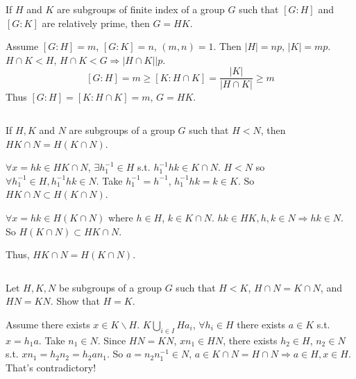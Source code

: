 $$ $$

\begin{ex}
    If $H$ and $K$ are subgroups of finite index of a group $G$ such that $\left[G:H\right]$ and $\left[G:K\right]$ are relatively prime, then $G=HK$.
\end{ex}

\begin{answer}
    Assume $\left[G:H\right]=m$, $\left[G:K\right]=n$, $(m,n)=1$. Then $\left| H \right| =np$, $\left| K \right|=mp$. $H\cap K<H$, $H\cap K<G\Rightarrow\left| H\cap K \right| |p$. \[\left[G:H\right]=m\geq \left[K:H\cap K\right]=\frac{\left| K \right| }{\left| H\cap K \right| }\geq m\] Thus $\left[G:H\right]=\left[K:H\cap K\right]=m$, $G=HK$.
\end{answer}

$$ $$

\begin{ex}
    If $H,K$ and $N$ are subgroups of a group $G$ such that $H<N$, then $HK\cap N=H(K\cap N)$. 
\end{ex}

\begin{answer}
    $\forall x=hk\in HK\cap N$, $\exists h_{1}^{-1}\in H$ s.t. $h_{1}^{-1}hk\in K\cap N$. $H<N$ so $\forall h_{1}^{-1}\in H, h_{1}^{-1}hk\in N$. Take $h_{1}^{-1}=h^{-1}$, $h_{1}^{-1}hk=k\in K$. So $HK\cap N\subset H(K\cap N)$.

    $\forall x= hk\in H(K\cap N)$ where $h\in H$, $k\in K\cap N$. $hk\in HK, h,k\in N\Rightarrow hk\in N$. So $H(K\cap N)\subset HK\cap N$. 

    Thus, $HK\cap N=H(K\cap N)$.
\end{answer}

$$ $$

\begin{ex}
    Let $H,K,N$ be subgroups of a group $G$ such that $H<K$, $H\cap N=K\cap N$, and $HN=KN$. Show that $H=K$.
\end{ex}

\begin{answer}
    Assume there exists $x\in K\backslash H$. $K\bigcup\limits_{i\in I}Ha_{i}$, $\forall h_{i}\in H$ there exists $a\in K$ s.t. $x=h_{1}a$. Take $n_{1}\in N$. Since $HN=KN$, $xn_{1}\in HN$, there exists $h_{2}\in H$, $n_{2}\in N$ s.t. $xn_{1}=h_{2}n_{2}=h_{2}an_{1}$. So $a=n_{2}n_{1}^{-1}\in N$, $a\in K\cap N=H\cap N\Rightarrow a\in H, x\in H$. That's contradictory!
\end{answer}

$$ $$

